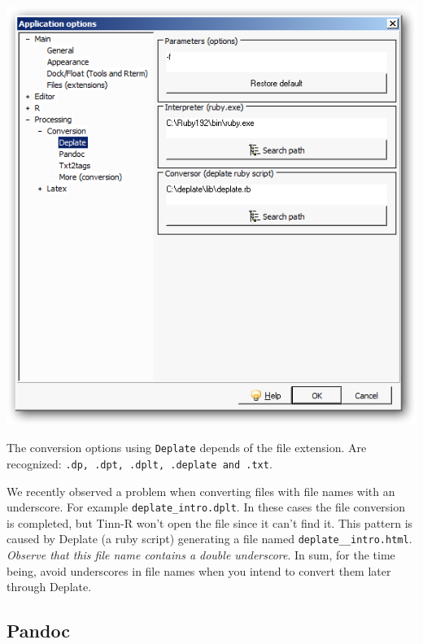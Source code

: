 \begin{itemize}
\begin{enumerate}
        \includegraphics[scale=0.50]{./res/app_processing_conversion_deplate.png}\\
    \end{enumerate}
\end{itemize}

The conversion options using \texttt{Deplate} depends of the file extension.
Are recognized: \texttt{.dp, .dpt, .dplt, .deplate and .txt}.

We recently observed a problem when converting files with file names with an
underscore. For example \texttt{deplate\_intro.dplt}. In these cases the file
conversion is completed, but Tinn-R won't open the file since it can't find it.
This pattern is caused by Deplate (a ruby script) generating a file named
\texttt{deplate\_\_intro.html}. \textit{Observe that this file name contains a
double underscore}. In sum, for the time being, avoid underscores in file
names when you intend to convert them later through Deplate.


\subsection{Pandoc}

